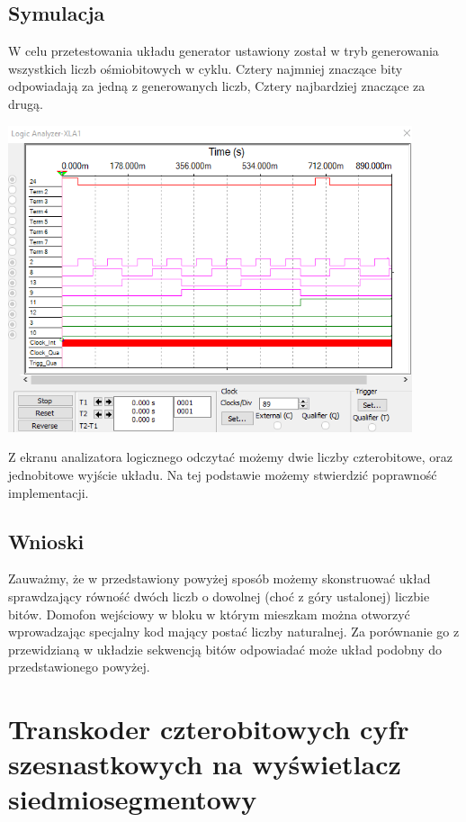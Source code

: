 \documentclass{article}
\begin{document}
        \subsection{Symulacja}
            W celu przetestowania układu generator ustawiony został w tryb generowania wszystkich liczb ośmiobitowych w cyklu. Cztery najmniej znaczące bity odpowiadają za jedną z generowanych liczb, Cztery najbardziej znaczące za drugą.   
            \begin{center}
                \includegraphics[height=9cm]{reports/img/Z1B_2.png}\\
            \end{center}
            Z ekranu analizatora logicznego odczytać możemy dwie liczby czterobitowe, oraz jednobitowe wyjście układu. Na tej podstawie możemy stwierdzić poprawność implementacji.

            
        \subsection{Wnioski}
            Zauważmy, że w przedstawiony powyżej sposób możemy skonstruować układ sprawdzający równość  dwóch liczb o dowolnej (choć z góry ustalonej) liczbie bitów. Domofon wejściowy w bloku w którym mieszkam można otworzyć wprowadzając specjalny kod mający postać liczby naturalnej. Za porównanie go z przewidzianą w układzie sekwencją bitów odpowiadać może układ podobny do przedstawionego powyżej. 

    \section{Transkoder czterobitowych cyfr szesnastkowych na wyświetlacz siedmiosegmentowy}
\end{document}
